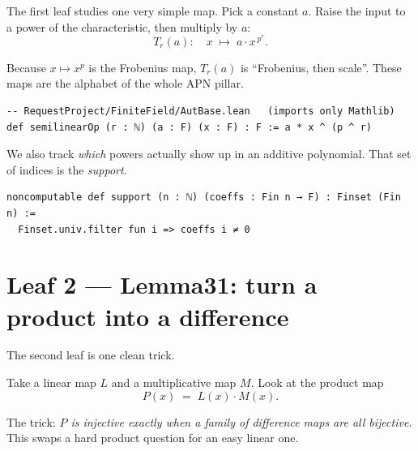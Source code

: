 \documentclass[11pt]{article}
\begin{document}
The first leaf studies one very simple map.
Pick a constant $a$.  Raise the input to a power of the characteristic,
then multiply by $a$:
\[
  T_r(a)\colon\quad x \;\longmapsto\; a \cdot x^{\,p^{r}} .
\]

Because $x \mapsto x^{p}$ is the Frobenius map, $T_r(a)$ is ``Frobenius, then
scale''.  These maps are the alphabet of the whole APN pillar.

\begin{center}
\end{center}

\begin{lstlisting}
-- RequestProject/FiniteField/AutBase.lean   (imports only Mathlib)
def semilinearOp (r : ℕ) (a : F) (x : F) : F := a * x ^ (p ^ r)
\end{lstlisting}

We also track \emph{which} powers actually show up in an additive polynomial.
That set of indices is the \emph{support}.

\begin{lstlisting}
noncomputable def support (n : ℕ) (coeffs : Fin n → F) : Finset (Fin n) :=
  Finset.univ.filter fun i => coeffs i ≠ 0
\end{lstlisting}

\section{Leaf 2 --- Lemma31: turn a product into a difference}

The second leaf is one clean trick.

Take a linear map $L$ and a multiplicative map $M$.
Look at the product map
\[
  P(x) \;=\; L(x)\cdot M(x) .
\]

The trick: \emph{$P$ is injective exactly when a family of difference maps are
all bijective.}  This swaps a hard product question for an easy linear one.

\begin{center}
\end{center}
\end{document}

